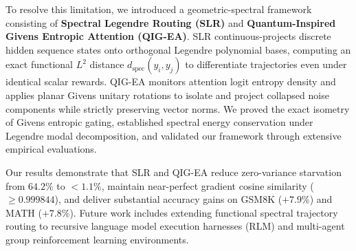 \documentclass{article}
\newcommand{\slr}{\textsc{SLR}\xspace}
\newcommand{\qigea}{\textsc{QIG-EA}\xspace}
\newcommand{\rlm}{\textsc{RLM}\xspace}
\begin{document}
To resolve this limitation, we introduced a geometric-spectral framework consisting of \textbf{Spectral Legendre Routing (\slr)} and \textbf{Quantum-Inspired Givens Entropic Attention (\qigea)}. \slr continuous-projects discrete hidden sequence states onto orthogonal Legendre polynomial bases, computing an exact functional $L^2$ distance $d_{\text{spec}}(y_i, y_j)$ to differentiate trajectories even under identical scalar rewards. \qigea monitors attention logit entropy density and applies planar Givens unitary rotations to isolate and project collapsed noise components while strictly preserving vector norms. We proved the exact isometry of Givens entropic gating, established spectral energy conservation under Legendre modal decomposition, and validated our framework through extensive empirical evaluations.

Our results demonstrate that \slr and \qigea reduce zero-variance starvation from $64.2\%$ to $<1.1\%$, maintain near-perfect gradient cosine similarity ($\ge 0.999844$), and deliver substantial accuracy gains on GSM8K ($+7.9\%$) and MATH ($+7.8\%$). Future work includes extending functional spectral trajectory routing to recursive language model execution harnesses (\rlm) and multi-agent group reinforcement learning environments.



\end{document}
